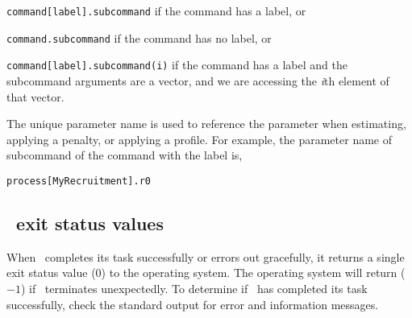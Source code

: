 \begin{description}
\item \texttt{command[label].subcommand} if the command has a label, or
\item \texttt{command.subcommand} if the command has no label, or
\item \texttt{command[label].subcommand(i)} if the command has a label and the subcommand arguments are a vector, and we are accessing the  \emph{i}th element of that vector. 
\end{description} 

The unique parameter name is used to reference the parameter when estimating, applying a penalty, or applying a profile. For example, the parameter name of subcommand  of the command  with the label  is,

\texttt{process[MyRecruitment].r0}

\subsection{\SPM\ exit status values}

When \SPM\ completes its task successfully or errors out gracefully, it returns a single exit status value ($0$) to the operating system. The operating system will return ($-1$) if \SPM\ terminates unexpectedly. To determine if \SPM\ has completed its task successfully, check the standard output for error and information messages.
